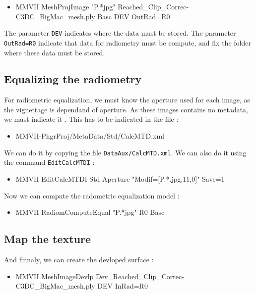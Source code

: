 \begin{itemize}
    \item {MMVII MeshProjImage "P.*jpg"  Reached\_Clip\_Correc-C3DC\_BigMac\_mesh.ply Basc DEV OutRad=R0}
\end{itemize}

The parameter {\tt DEV} indicates where the data must be stored.
The parameter {\tt OutRad=R0} indicate that data for radiometry 
must be compute, and fix the folder where these data must be stored.


\subsection{Equalizing the radiometry}

For radiometric equalization, we must know the aperture used for each image,
as the vignettage is dependand of aperture. As these images contains no metadata,
we must indicate it . This has to be indicated in the file :

\begin{itemize}
    \item {MMVII-PhgrProj/MetaData/Std/CalcMTD.xml}
\end{itemize}

We can do it by copying the file {\tt DataAux/CalcMTD.xml}. We can also
do it using the command {\tt EditCalcMTDI} :

\begin{itemize}
      \item {MMVII  EditCalcMTDI Std Aperture "Modif=[P.*.jpg,11,0]"  Save=1}
\end{itemize}

Now we can compute the radometric equalization model :

\begin{itemize}
     \item {MMVII RadiomComputeEqual "P.*jpg" R0 Basc}
\end{itemize}



\subsection{Map the texture}

And finnaly, we can create the devloped surface :


\begin{itemize}
	\item {MMVII MeshImageDevlp Dev\_Reached\_Clip\_Correc-C3DC\_BigMac\_mesh.ply  DEV InRad=R0}
\end{itemize}






